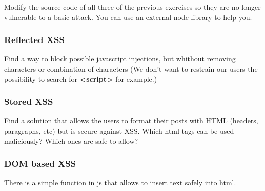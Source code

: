 \begin{Exercise}[label={websec-xss-prevention}]
Modify the source code of all three of the previous exercises so they are no longer vulnerable to a basic attack. You can use an external node library to help you.

\subsubsection{Reflected XSS}
Find a way to block possible javascript injections, but whithout removing characters or combination of characters (We don't want to restrain our users the possibility to search for \textbf{<script>} for example.)
\subsubsection{Stored XSS}
Find a solution that allows the users to format their posts with HTML (headers, paragraphs, etc) but is secure against XSS. Which html tags can be used maliciously? Which ones are safe to allow?
\subsubsection{DOM based XSS}
There is a simple function in js that allows to insert text safely into html.
\end{Exercise}

